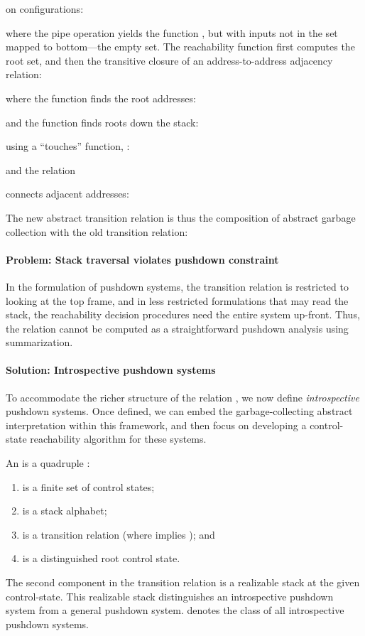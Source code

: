 on
configurations:

  where the pipe operation  yields the function , but with
  inputs not in the set  mapped to bottom---the empty set.
The reachability function 
  first computes the root set, and then the transitive closure of an
  address-to-address adjacency relation: 

where the function  
  finds the root addresses:
  
  and the  function
  finds roots down the stack:
  
  using a ``touches'' function, :
  
  and the relation
  
  connects adjacent addresses:
  

The new abstract transition relation is thus the composition of abstract garbage collection with the old transition relation:



\paragraph{Problem: Stack traversal violates pushdown constraint}

In the formulation of pushdown systems, the transition relation is restricted
to looking at the top frame, and in less restricted formulations that may read the stack,
the reachability decision procedures need the entire system up-front.
Thus, the relation  cannot be computed as
a straightforward pushdown analysis using summarization.


\paragraph{Solution: Introspective pushdown systems}
To accommodate the richer structure of the relation , we
now define \emph{introspective} pushdown systems.
Once defined, we can embed the garbage-collecting abstract interpretation
within this framework, and then focus on developing a control-state
reachability algorithm for these systems.


An  is a quadruple
:
\begin{enumerate}

\item  is a finite set of control states;

\item  is a stack alphabet; 

\item  is a transition relation (where  implies ); and

\item  is a distinguished root control state. 
\end{enumerate}
The second component in the transition relation is 
a realizable stack at the given control-state.
This realizable stack distinguishes an introspective pushdown system
from a general pushdown system.
  denotes the class of all introspective pushdown
systems.


